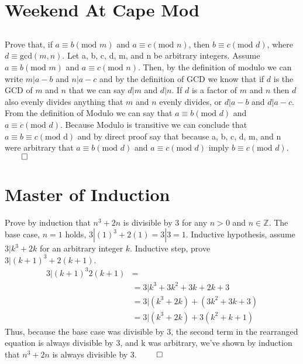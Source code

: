 \documentclass[11pt]{article}
\newcommand{\Z}{\mathbb{Z}}
\begin{document}
\subsection*{} %
\subsection*{} %
\subsection*{} %

\section{Weekend At Cape Mod} %
\subsection{} %
Prove that, if $a \equiv b (\text{mod } m)$ and $a \equiv c (\text{mod } n)$, then $b \equiv c (\text{mod } d)$, where $d \equiv \text{gcd}(m, n)$.
Let a, b, c, d, m, and n be arbitrary integers. Assume $a \equiv b (\text{mod } m)$ and $a \equiv c (\text{mod } n)$. Then, by the definition of modulo we can write $m | a - b$ and $n | a - c$ and by the definition of GCD we know that if $d$ is the GCD of $m$ and $n$ that we can say $d | m$ and $d | n$. If $d$ is a factor of $m$ and $n$ then $d$ also evenly divides anything that $m$ and $n$ evenly divides, or $d | a - b$ and $d | a - c$. From the definition of Modulo we can say that $a \equiv b (\text{mod } d)$ and $a \equiv c (\text{mod } d)$. Because Modulo is transitive we can conclude that $a \equiv b \equiv c (\text{mod d})$ and by direct proof say that because a, b, c, d, m, and n were arbitrary that $a \equiv b (\text{mod } d)$ and $a \equiv c (\text{mod } d)$ imply $b \equiv c (\text{mod } d)$. $\qed$

\section{Master of Induction} %
Prove by induction that $n^3 + 2n$ is divisible by 3 for any $n > 0$ and $n \in \Z$. The base case, $n = 1$ holds, $3 | (1)^3 + 2(1) = 3 | 3 = 1$. Inductive hypothesis, assume $3 | k^3 + 2k$ for an arbitrary integer $k$. Inductive step, prove $3 | (k + 1)^3 + 2(k + 1)$. 
\begin{align*}
	3 | (k + 1)^3 2(k + 1) &= \\
	&= 3 | k^3 + 3k^2 + 3k + 2k + 3 \\
	&= 3 | (k^3 + 2k) + (3k^2 + 3k + 3) \tag*{Inductive Hypothesis} \\
	&= 3 | (k^3 + 2k) + 3(k^2 + k + 1)
\end{align*}
Thus, because the base case was divisible by 3, the second term in the rearranged equation is always divisible by 3, and k was arbitrary, we've shown by induction that $n^3 + 2n$ is always divisible by 3. $\qed$
\end{document}
